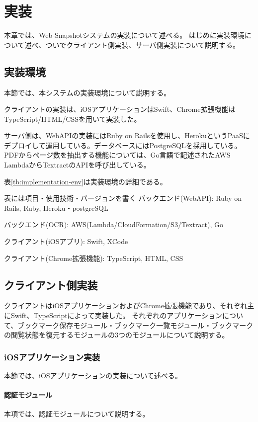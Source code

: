 \chapter{実装}
\label{chap:implementation}
本章では、Web-Snapshotシステムの実装について述べる。
はじめに実装環境について述べ、ついでクライアント側実装、サーバ側実装について説明する。

\section{実装環境}
本節では、本システムの実装環境について説明する。

クライアントの実装は、iOSアプリケーションはSwift、Chrome拡張機能はTypeScript/HTML/CSSを用いて実装した。

サーバ側は、WebAPIの実装にはRuby on Railsを使用し、Heroku\cite{}というPaaSにデプロイして運用している。データベースにはPostgreSQLを採用している。
PDFからページ数を抽出する機能については、Go言語で記述されたAWS LambdaからTextract\cite{}のAPIを呼び出している。

表\ref{tb:implementation-env}は実装環境の詳細である。

表には項目・使用技術・バージョンを書く
バックエンド(WebAPI): Ruby on Rails, Ruby, Heroku・postgreSQL

バックエンド(OCR): AWS(Lambda/CloudFormation/S3/Textract), Go

クライアント(iOSアプリ): Swift, XCode

クライアント(Chrome拡張機能): TypeScript, HTML, CSS

\section{クライアント側実装}
クライアントはiOSアプリケーションおよびChrome拡張機能であり、それぞれ主にSwift、TypeScriptによって実装した。
それぞれのアプリケーションについて、ブックマーク保存モジュール・ブックマーク一覧モジュール・ブックマークの閲覧状態を復元するモジュールの3つのモジュールについて説明する。

\subsection{iOSアプリケーション実装}
本節では、iOSアプリケーションの実装について述べる。

\subsubsection{認証モジュール}
本項では、認証モジュールについて説明する。

